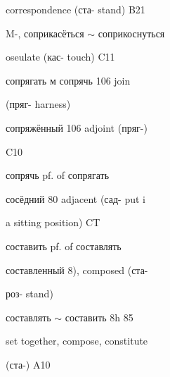 \begin{minipage}[t]{0.475\textwidth}
\noindent correspondence (ста- stand) B21\par
\noindent M-, соприкасёться $\sim$ соприкоснуться\par
{} oseulate (кас- touch) C11\par
\noindent сопрягать м сопрячь 106 join\par
\noindent (пряг- harness)\par
\noindent сопряжённый 106 adjoint (пряг-)\par
\noindent C10\par
\noindent сопрячь pf. of сопрягать\par
\noindent сосёдний 80 adjacent (сад- put i\par
\noindent a sitting position) CT\par
\noindent составить pf. of составлять\par
\noindent составленный 8), composed (ста-\par
\noindent роз- stand)\par
\noindent составлять $\sim$ составить 8h 85\par
\noindent set together, compose, constitute\par
\noindent (ста-) A10\par
\end{minipage}
\endgroup

